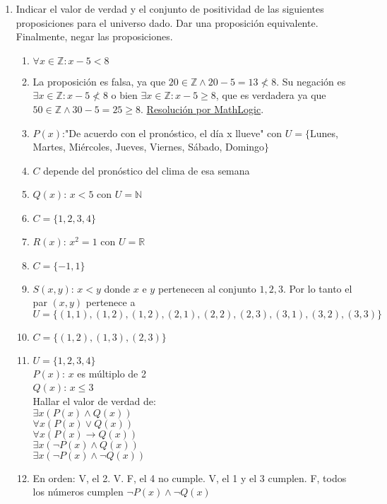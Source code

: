 \documentclass[a4paper]{article}
\newcommand{\answer}{\item[**]}
\newcommand{\exercise}{\item}
\newcommand{\then}{\to}
\begin{document}
\begin{enumerate}
\begin{enumerate} [label=(\alph*)]
	\end{enumerate}


	\exercise Indicar el valor de verdad y el conjunto de positividad de las siguientes proposiciones para el universo dado. Dar una proposición equivalente. Finalmente, negar las proposiciones.
	\begin{enumerate} [label=(\alph*)]

		\item $\forall x \in \mathbb{Z}: x-5 < 8$ 
		\answer La proposición es falsa, ya que $20 \in \mathbb{Z} \land 20-5 = 13 \nless 8$. Su negación es $\exists x \in \mathbb{Z}: x-5 \nless 8$ o bien $\exists x \in \mathbb{Z}: x-5 \geq 8$, que es verdadera ya que $50 \in \mathbb{Z} \land 30-5 = 25 \geq 8$. \href{https://youtu.be/rnaCiSpVtP4?t=303}{Resolución por MathLogic}.

		\item $P(x)$:"De acuerdo con el pronóstico, el día x llueve" con $U = \{$Lunes, Martes, Miércoles, Jueves, Viernes, Sábado, Domingo$\}$
		\answer $C$ depende del pronóstico del clima de esa semana

		\item $Q(x)$: $x < 5$ con $U = \mathbb{N}$
		\answer $C = \{1,2,3,4\}$

		\item $R(x)$: $x^2 =1$ con $U = \mathbb{R}$
		\answer $C = \{-1,1\}$

		\item $S(x,y)$: $x < y$ donde $x$ e $y$ pertenecen al conjunto ${1,2,3}$. Por lo tanto el par $(x,y)$ pertenece a $U = \{ (1,1), (1,2), (1,2), (2,1), (2,2), (2,3), (3,1), (3,2), (3,3) \}$
		\answer $C = \{ (1,2), (1,3), (2,3) \}$

		\item $U = \{1,2,3,4\}$ \\
			$P(x)$: $x$ es múltiplo de 2 \\
			$Q(x)$: $x \leq 3$ \\
			Hallar el valor de verdad de: \\
			$\exists x ( P(x) \land  Q(x) )$ \\ 
			$\forall x ( P(x) \lor  Q(x) )$ \\
			$\forall x ( P(x) \then  Q(x) )$ \\
			$\exists x ( \neg P(x) \land  Q(x) )$ \\
			$\exists x ( \neg P(x) \land  \neg Q(x) )$ 
		\answer En orden: V, el 2. V. F, el 4 no cumple. V, el 1 y el 3 cumplen. F, todos los números cumplen $\neg P(x) \land  \neg Q(x)$ 


\end{enumerate}
\end{enumerate}
\end{document}
